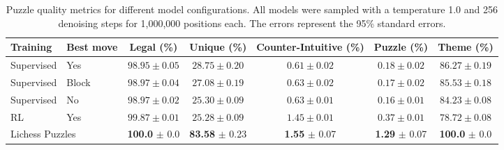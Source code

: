 \documentclass[letterpaper]{article} %
\begin{document}
\begin{table}[t]
    \centering
    \caption{Puzzle quality metrics for different model configurations. All models were sampled with a temperature 1.0 and 256 denoising steps for 1,000,000 positions each. The errors represent the 95\% standard errors.}
    \label{tab:metrics}
    \begin{tabular}{llccccc}
        \toprule
        Training                            & Best move                & Legal (\%)                & Unique (\%)              & Counter-Intuitive (\%)   & Puzzle (\%)              & Theme (\%)       \\
        \midrule
        Supervised                          & Yes                      & $98.95 \pm 0.05$          & $28.75 \pm 0.20$         & $0.61 \pm 0.02$          & $0.18 \pm 0.02$          & $86.27 \pm 0.19$ \\
        Supervised                          & Block                    & $98.97 \pm 0.04$          & $27.08 \pm 0.19$         & $0.63 \pm 0.02$          & $0.17 \pm 0.02$          & $85.53 \pm 0.18$ \\
        Supervised                          & No                       & $98.97 \pm 0.02$          & $25.30 \pm 0.09$         & $0.63 \pm 0.01$          & $0.16 \pm 0.01$          & $84.23 \pm 0.08$ \\
        RL                                  & Yes                      & $99.87 \pm 0.01$          & $25.28 \pm 0.09$         & $1.45 \pm 0.01$          & $0.37 \pm 0.01$          & $78.72 \pm 0.08$ \\
        \midrule
        \multicolumn{2}{l}{Lichess Puzzles} & \textbf{100.0} $\pm$ 0.0 & \textbf{83.58} $\pm$ 0.23 & \textbf{1.55} $\pm$ 0.07 & \textbf{1.29} $\pm$ 0.07 & \textbf{100.0} $\pm$ 0.0                    \\
        \bottomrule
    \end{tabular}
\end{table}
\end{document}
